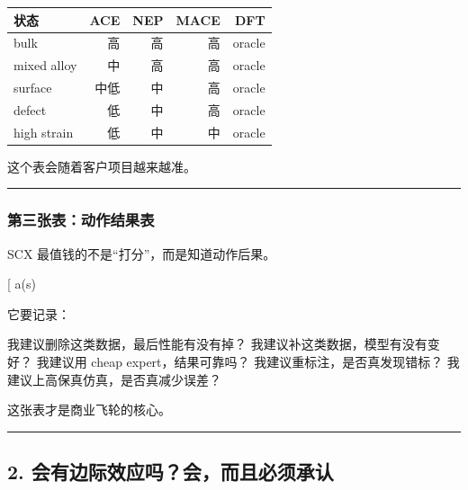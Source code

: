 \documentclass[
  12pt,
]{ctexart}
\newenvironment{Shaded}{}{}
\newcommand{\NormalTok}[1]{#1}
\begin{document}
\begin{longtable}[]{@{}lrrrr@{}}
\toprule\noalign{}
状态 & ACE & NEP & MACE & DFT \\
\midrule\noalign{}
\endhead
\bottomrule\noalign{}
\endlastfoot
bulk & 高 & 高 & 高 & oracle \\
mixed alloy & 中 & 高 & 高 & oracle \\
surface & 中低 & 中 & 高 & oracle \\
defect & 低 & 中 & 高 & oracle \\
high strain & 低 & 中 & 中 & oracle \\
\end{longtable}

这个表会随着客户项目越来越准。

\begin{center}\rule{0.5\linewidth}{0.5pt}\end{center}

\subsubsection{第三张表：动作结果表}\label{ux7b2cux4e09ux5f20ux8868ux52a8ux4f5cux7ed3ux679cux8868}

SCX 最值钱的不是``打分''，而是知道动作后果。

{[}
a(s)\in{\text{keep, compress, relabel, rerun, route, acquire, distill}}{]}

它要记录：

\begin{Shaded}
\begin{Highlighting}[]
\NormalTok{我建议删除这类数据，最后性能有没有掉？}
\NormalTok{我建议补这类数据，模型有没有变好？}
\NormalTok{我建议用 cheap expert，结果可靠吗？}
\NormalTok{我建议重标注，是否真发现错标？}
\NormalTok{我建议上高保真仿真，是否真减少误差？}
\end{Highlighting}
\end{Shaded}

这张表才是商业飞轮的核心。

\begin{center}\rule{0.5\linewidth}{0.5pt}\end{center}

\subsection{2.
会有边际效应吗？会，而且必须承认}\label{ux4f1aux6709ux8fb9ux9645ux6548ux5e94ux5417ux4f1aux800cux4e14ux5fc5ux987bux627fux8ba4}
\end{document}
